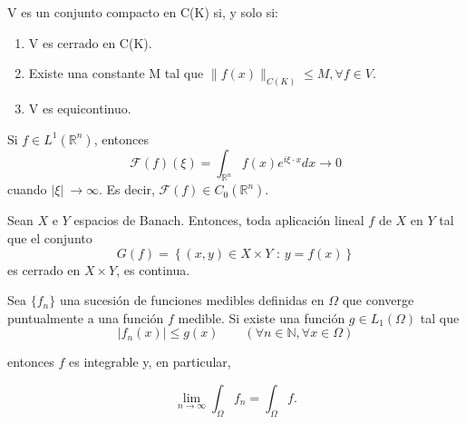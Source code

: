 \begin{lema}\label{thm:h05}
V es un conjunto compacto en C(K) si, y solo si:
\begin{enumerate}

	\item V es cerrado en C(K).
	\item Existe una constante M tal que \(\|f(x)\|_{C(K)} \leq M, \forall f \in V\).
	\item V es equicontinuo. 
\end{enumerate}
\end{lema}

\begin{lema}
Si $f\in L^{1}(\mathds{R}^{n})$, entonces 
\begin{equation}
\mathcal{F}(f)(\xi) = \int_{\mathds{R}^{n}}f(x)e^{i\xi\cdot x} dx \rightarrow 0
\end{equation}
 cuando  $\vert \xi \vert \ \rightarrow \infty$. Es decir, $\mathcal{F}(f)\in C_{0}(\mathds{R}^{n})$.
\end{lema}

\begin{teorema}\label{thm:h06}
Sean $X$ e $Y$ espacios de Banach. Entonces, toda aplicación lineal $f$ de $X$ en $Y$ tal que el conjunto
\begin{equation}
    G(f) = \left\{ (x,y)\in X\times Y \text{ : } y=f(x) \right\}
\end{equation}
es cerrado en $X\times Y$, es continua. 
\end{teorema}

\begin{teorema}\label{thm:h08}

Sea $\{ f_n\}$ una sucesión de funciones medibles definidas en $\Omega$ que converge puntualmente a una función $f$ medible.  Si existe una función $g\in L_1 (\Omega)$ tal que 
\begin{equation}
    \vert f_n (x) \vert \leq g(x) \qquad (\forall n\in \mathds{N}, \forall x\in \Omega)
\end{equation}

entonces $f$ es integrable y, en particular, 

\begin{equation}
    \lim_{n\rightarrow \infty} \int_{\Omega}f_n = \int_{\Omega} f.
\end{equation}
\end{teorema}
